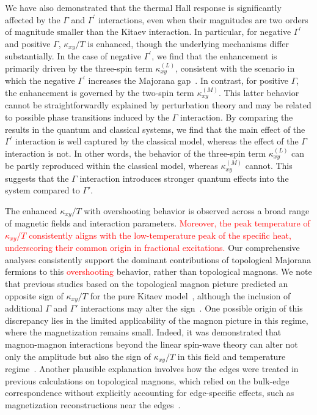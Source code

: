\documentclass[twocolumn,superscriptaddress,showpacs, longbibliography, aps, prx]{revtex4-2}
\newcommand{\red}[1]{\textcolor{red}{#1}}
\begin{document}
We have also demonstrated that the thermal Hall response is significantly affected by 
the $\Gamma$ and $\Gamma^{\prime}$ interactions, even when their magnitudes are two orders of magnitude smaller than the Kitaev interaction. 
In particular, for negative $\Gamma^{\prime}$ and positive $\Gamma$, $\kappa_{xy}/T$ is enhanced, though the underlying mechanisms differ substantially.
In the case of negative $\Gamma^{\prime}$, we find that the enhancement is primarily driven by the three-spin term $\kappa_{xy}^{(L)}$, consistent with the scenario in which the negative $\Gamma^{\prime}$ increases the Majorana gap~\cite{TakikawaF2020}.
In contrast, for positive $\Gamma$, the enhancement is governed by the two-spin term $\kappa_{xy}^{(M)}$.
This latter behavior cannot be straightforwardly explained by perturbation theory and may be related to possible phase transitions induced by the $\Gamma$ interaction.
By comparing the results in the quantum and classical systems, we find that the main effect of the $\Gamma^{\prime}$ interaction is well captured by the classical model, 
whereas the effect of the $\Gamma$ interaction is not.
In other words, the behavior of the three-spin term $\kappa_{xy}^{(L)}$ 
can be partly reproduced within the classical model, whereas $\kappa_{xy}^{(M)}$ cannot.
This suggests that the $\Gamma$ interaction introduces stronger quantum effects into the system compared to $\Gamma'$.

The enhanced $\kappa_{xy}/T$ with overshooting behavior is observed across a broad range of magnetic fields and interaction parameters. 
\red{Moreover, the peak temperature of $\kappa_{xy}/T$ consistently aligns with the low-temperature peak of the specific heat, underscoring their common origin in fractional excitations.} 
Our comprehensive analyses consistently support the dominant contributions of topological Majorana fermions to this \red{overshooting} behavior, rather than topological magnons. 
We note that previous studies based on the topological magnon picture predicted an opposite sign of $\kappa_{xy}/T$ for the pure Kitaev model~\cite{McClartyDGRPMP2018,Koyama2024}, although the inclusion of additional $\Gamma$ and $\Gamma'$ interactions may alter the sign~\cite{ChernZK2021,ZhangCK2021}. 
One possible origin of this discrepancy lies in the limited applicability of the magnon picture in this regime, where the magnetization remains small. 
Indeed, it was demonstrated that magnon-magnon interactions beyond the linear spin-wave theory can alter not only the amplitude but also the sign of $\kappa_{xy}/T$ in this field and temperature regime~\cite{Koyama2024}. 
Another plausible explanation involves how the edges were treated in previous calculations on topological magnons, which relied on the bulk-edge correspondence without explicitly accounting for edge-specific effects, such as magnetization reconstructions near the edges~\cite{KoyamaN2023,HabelMWK2024}. 
\end{document}
